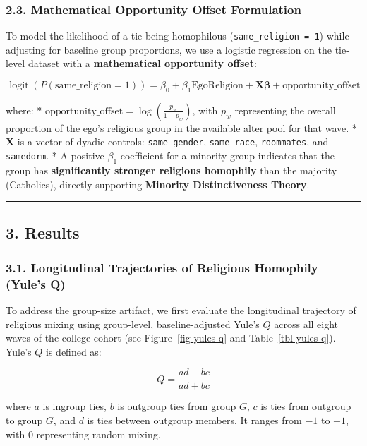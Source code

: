 \documentclass[
  letterpaper,
  DIV=11,
  numbers=noendperiod]{scrartcl}
\begin{document}
\subsubsection{2.3. Mathematical Opportunity Offset
Formulation}\label{mathematical-opportunity-offset-formulation}

To model the likelihood of a tie being homophilous
(\texttt{same\_religion\ =\ 1}) while adjusting for baseline group
proportions, we use a logistic regression on the tie-level dataset with
a \textbf{mathematical opportunity offset}:

\[\operatorname{logit}(P(\text{same\_religion} = 1)) = \beta_0 + \beta_1 \text{EgoReligion} + \mathbf{X}\mathbf{\beta} + \text{opportunity\_offset}\]

where: *
\(\text{opportunity\_offset} = \log\left(\frac{p_w}{1 - p_w}\right)\),
with \(p_w\) representing the overall proportion of the ego's religious
group in the available alter pool for that wave. * \(\mathbf{X}\) is a
vector of dyadic controls: \texttt{same\_gender}, \texttt{same\_race},
\texttt{roommates}, and \texttt{samedorm}. * A positive \(\beta_1\)
coefficient for a minority group indicates that the group has
\textbf{significantly stronger religious homophily} than the majority
(Catholics), directly supporting \textbf{Minority Distinctiveness
Theory}.

\begin{center}\rule{0.5\linewidth}{0.5pt}\end{center}

\subsection{3. Results}\label{results}

\subsubsection{3.1. Longitudinal Trajectories of Religious Homophily
(Yule's
Q)}\label{longitudinal-trajectories-of-religious-homophily-yules-q}

To address the group-size artifact, we first evaluate the longitudinal
trajectory of religious mixing using group-level, baseline-adjusted
Yule's \(Q\) across all eight waves of the college cohort (see
Figure~\ref{fig-yules-q} and Table~\ref{tbl-yules-q}). Yule's \(Q\) is
defined as:

\[Q = \frac{ad - bc}{ad + bc}\]

where \(a\) is ingroup ties, \(b\) is outgroup ties from group \(G\),
\(c\) is ties from outgroup to group \(G\), and \(d\) is ties between
outgroup members. It ranges from \(-1\) to \(+1\), with \(0\)
representing random mixing.
\end{document}
